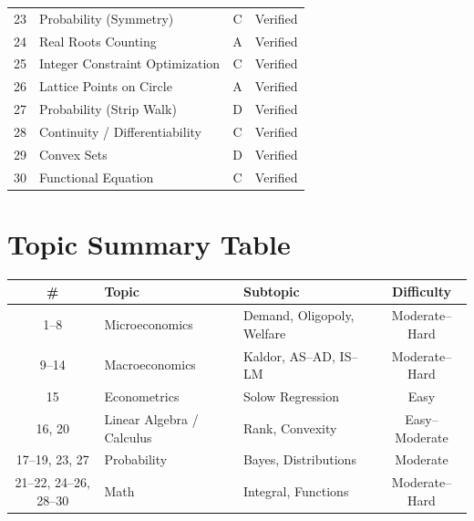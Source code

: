 \documentclass[11pt]{article}
\begin{document}
\begin{center}
\begin{longtable}{c l c c}
23 & Probability (Symmetry)                       & C & Verified \\
24 & Real Roots Counting                          & A & Verified \\
25 & Integer Constraint Optimization              & C & Verified \\
26 & Lattice Points on Circle                     & A & Verified \\
27 & Probability (Strip Walk)                     & D & Verified \\
28 & Continuity / Differentiability               & C & Verified \\
29 & Convex Sets                                  & D & Verified \\
30 & Functional Equation                          & C & Verified \\
\bottomrule
\end{longtable}
\end{center}

\bigskip

\section*{Topic Summary Table}

\begin{center}
\begin{tabular}{c l l c}
\toprule
\# & Topic & Subtopic & Difficulty \\
\midrule
1--8   & Microeconomics & Demand, Oligopoly, Welfare       & Moderate--Hard \\
9--14  & Macroeconomics & Kaldor, AS--AD, IS--LM           & Moderate--Hard \\
15     & Econometrics   & Solow Regression                 & Easy           \\
16, 20 & Linear Algebra / Calculus & Rank, Convexity       & Easy--Moderate \\
17--19, 23, 27 & Probability   & Bayes, Distributions     & Moderate       \\
21--22, 24--26, 28--30 & Math & Integral, Functions       & Moderate--Hard \\
\bottomrule
\end{tabular}
\end{center}

\newpage

\end{document}
